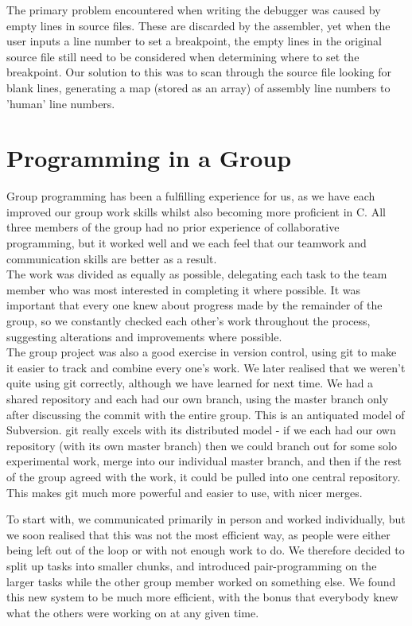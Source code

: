 \documentclass[11pt]{report}
\begin{document}
The primary problem encountered when writing the debugger was caused by empty
lines in source files. These are discarded by the assembler, yet when the user
inputs a line number to set a breakpoint, the empty lines in the original source
file still need to be considered when determining where to set the breakpoint.
Our solution to this was to scan through the source file looking for blank lines,
generating a map (stored as an array) of assembly line numbers to 'human' line
numbers.

\section*{Programming in a Group}

Group programming has been a fulfilling experience for us, as we have each
improved our group work skills whilst also becoming more proficient in C. All
three members of the group had no prior experience of collaborative programming,
but it worked well and we each feel that our teamwork and communication skills
are better as a result.
\\[2ex]
The work was divided as equally as possible, delegating each task to the team
member who was most interested in completing it where possible. It was important
that every one knew about progress made by the remainder of the group, so we
constantly checked each other's work throughout the process, suggesting
alterations and improvements where possible.
\\[2ex]
The group project was also a good exercise in version control, using git to make
it easier to track and combine every one's work. We later realised that we
weren't quite using git correctly, although we have learned for next time. We
had a shared repository and each had our own branch, using the master branch
only after discussing the commit with the entire group. This is an antiquated
model of Subversion. git really excels with its distributed model - if we each
had our own repository (with its own master branch) then we could branch out for
some solo experimental work, merge into our individual master branch, and then
if the rest of the group agreed with the work, it could be pulled into one central
repository. This makes git much more powerful and easier to use, with nicer merges.

\newpage

To start with, we communicated primarily in person and worked individually, but
we soon realised that this was not the most efficient way, as people were either
being left out of the loop or with not enough work to do. We therefore decided to
split up tasks into smaller chunks, and introduced pair-programming on the larger
tasks while the other group member worked on something else. We found this new
system to be much more efficient, with the bonus that everybody knew what the
others were working on at any given time.
\end{document}
